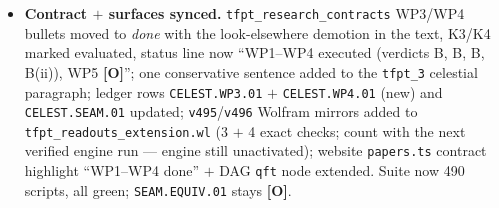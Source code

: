 \documentclass[11pt]{article}
\providecommand{\mO}{\textbf{[O]}}\providecommand{\mX}{\textbf{[X]}}
\begin{document}
\begin{itemize}[leftmargin=1.5em]
cumulative count $31s^2{+}92s{+}60$, $31=k{+}h^\vee$; $f_n/\chi_n$ strictly increasing $n=1..12$); (c)
the level-2 null ideal deletes exactly $27000=30^3=(h^\vee)^3$ out of
$\mathrm{Sym}^2(248)=1{+}3875{+}27000$ --- no jet analogue. \emph{But} the boundary/period reading holds
exactly at the current stratum (zero modes $=60=C_0$ currents, jet slice cycles $(60,64,60,64)$, one
$\mu_4$ period sums to 248, glue weights $(0,1,1,1)$ integer; free loop Fock $897266\gg248$, so the
truncation must come from a limit) --- the same MMST scaling-limit shape as \texttt{SEAM.EQUIV.01}
(\texttt{v336}/\texttt{v449}). K4 fires only against the exact-block reading; the constructive limit
question passes to WP5. Verdict B(ii).
\item \textbf{Contract $+$ surfaces synced.} \texttt{tfpt\_research\_contracts} WP3/WP4 bullets moved to
\emph{done} with the look-elsewhere demotion in the text, K3/K4 marked evaluated, status line now
``WP1--WP4 executed (verdicts B, B, B, B(ii)), WP5 \mO''; one conservative sentence added to the
\texttt{tfpt\_3} celestial paragraph; ledger rows \texttt{CELEST.WP3.01} $+$ \texttt{CELEST.WP4.01} (new)
and \texttt{CELEST.SEAM.01} updated; \texttt{v495}/\texttt{v496} Wolfram mirrors added to
\texttt{tfpt\_readouts\_extension.wl} (3 $+$ 4 exact checks; count with the next verified engine run ---
engine still unactivated); website \texttt{papers.ts} contract highlight ``WP1--WP4 done'' $+$ DAG
\texttt{qft} node extended. Suite now 490 scripts, all green; \texttt{SEAM.EQUIV.01} stays \mO.
\end{itemize}
\end{document}
